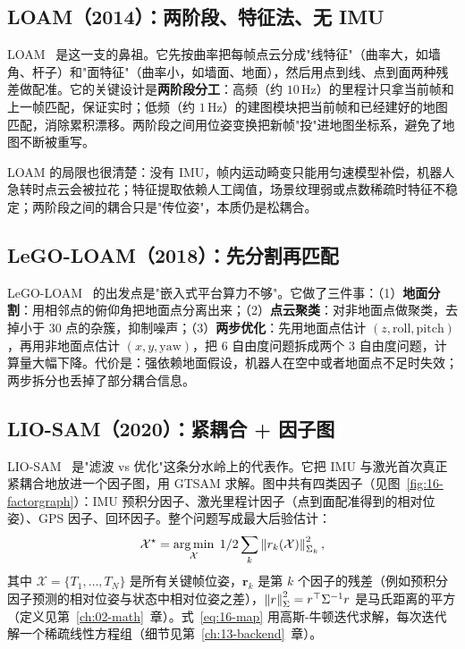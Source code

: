 \subsection{LOAM（2014）：两阶段、特征法、无 IMU}

LOAM~\cite{zhang2014loam} 是这一支的鼻祖。它先按曲率把每帧点云分成"线特征"（曲率大，如墙角、杆子）和"面特征"（曲率小，如墙面、地面），然后用点到线、点到面两种残差做配准。它的关键设计是\textbf{两阶段分工}：高频（约 $10$\,Hz）的里程计只拿当前帧和上一帧匹配，保证实时；低频（约 $1$\,Hz）的建图模块把当前帧和已经建好的地图匹配，消除累积漂移。两阶段之间用位姿变换把新帧"投"进地图坐标系，避免了地图不断被重写。

LOAM 的局限也很清楚：没有 IMU，帧内运动畸变只能用匀速模型补偿，机器人急转时点云会被拉花；特征提取依赖人工阈值，场景纹理弱或点数稀疏时特征不稳定；两阶段之间的耦合只是"传位姿"，本质仍是松耦合。

\subsection{LeGO-LOAM（2018）：先分割再匹配}

LeGO-LOAM~\cite{shan2018lego} 的出发点是"嵌入式平台算力不够"。它做了三件事：（1）\textbf{地面分割}：用相邻点的俯仰角把地面点分离出来；（2）\textbf{点云聚类}：对非地面点做聚类，去掉小于 30 点的杂簇，抑制噪声；（3）\textbf{两步优化}：先用地面点估计 $(z,\mathrm{roll},\mathrm{pitch})$，再用非地面点估计 $(x,y,\mathrm{yaw})$，把 6 自由度问题拆成两个 3 自由度问题，计算量大幅下降。代价是：强依赖地面假设，机器人在空中或者地面点不足时失效；两步拆分也丢掉了部分耦合信息。

\subsection{LIO-SAM（2020）：紧耦合 + 因子图}

LIO-SAM~\cite{shan2020liosam} 是"滤波 vs 优化"这条分水岭上的代表作。它把 IMU 与激光首次真正紧耦合地放进一个因子图，用 GTSAM 求解。图中共有四类因子（见图~\ref{fig:16-factorgraph}）：IMU 预积分因子、激光里程计因子（点到面配准得到的相对位姿）、GPS 因子、回环因子。整个问题写成最大后验估计：
\begin{equation}\label{eq:16-map}
  \mathcal{X}^{\star}=\operatorname*{arg\,min}_{\mathcal{X}}\;1/2\sum_{k}\left\lVert r_k(\mathcal{X}) \right\rVert^{2}_{\Sigma_k},
\end{equation}
其中 $\mathcal{X}=\{T_1,\dots,T_N\}$ 是所有关键帧位姿，$\bm{r}_k$ 是第 $k$ 个因子的残差（例如预积分因子预测的相对位姿与状态中相对位姿之差），$\left\lVert r \right\rVert^{2}_{\Sigma}=r^{\top}\Sigma^{-1}r$ 是马氏距离的平方（定义见第~\ref{ch:02-math}~章）。式~\eqref{eq:16-map} 用高斯-牛顿迭代求解，每次迭代解一个稀疏线性方程组（细节见第~\ref{ch:13-backend}~章）。

